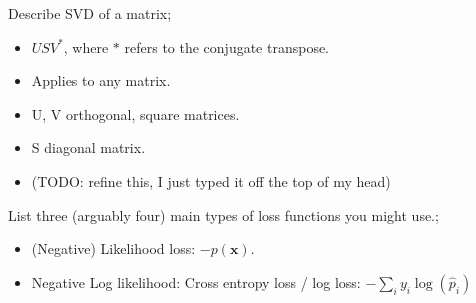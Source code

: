 \documentclass{article}
\begin{document}
Describe SVD of a matrix; \begin{itemize} \item $USV^*$, where $*$ refers to the conjugate transpose. \item Applies to any matrix. \item U, V orthogonal, square matrices. \item S diagonal matrix. \item (TODO: refine this, I just typed it off the top of my head) \end{itemize}

List three (arguably four) main types of loss functions you might use.; \begin{itemize} \item (Negative) Likelihood loss: $-p(\mathbf{x})$. \item Negative Log likelihood: Cross entropy loss / log loss: $-\sum_i y_i\log(\hat{p}_i)$ \end{itemize}
\end{document}
